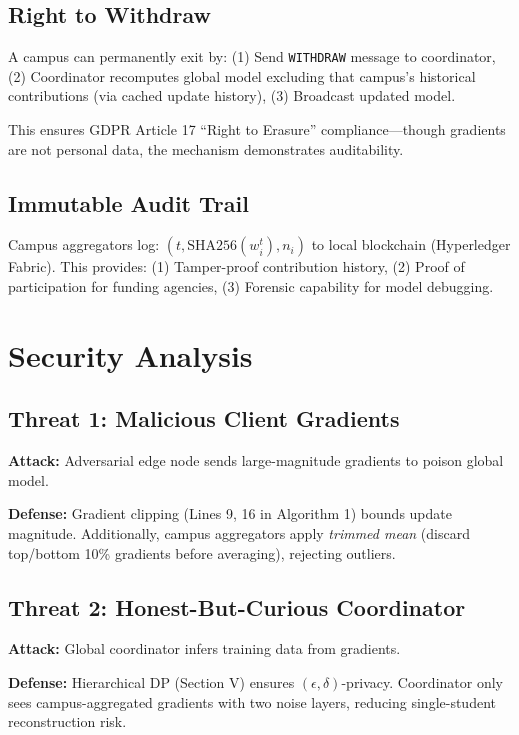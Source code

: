 \documentclass[conference]{IEEEtran}
\begin{document}
\subsection{Right to Withdraw}

A campus can permanently exit by: (1) Send \texttt{WITHDRAW} message to coordinator, (2) Coordinator recomputes global model excluding that campus's historical contributions (via cached update history), (3) Broadcast updated model.

This ensures GDPR Article 17 ``Right to Erasure'' compliance—though gradients are not personal data, the mechanism demonstrates auditability.

\subsection{Immutable Audit Trail}

Campus aggregators log: $(t, \text{SHA256}(w_i^t), n_i)$ to local blockchain (Hyperledger Fabric). This provides: (1) Tamper-proof contribution history, (2) Proof of participation for funding agencies, (3) Forensic capability for model debugging.

\section{Security Analysis}

\subsection{Threat 1: Malicious Client Gradients}

\textbf{Attack:} Adversarial edge node sends large-magnitude gradients to poison global model.

\textbf{Defense:} Gradient clipping (Lines 9, 16 in Algorithm 1) bounds update magnitude. Additionally, campus aggregators apply \textit{trimmed mean} (discard top/bottom 10\% gradients before averaging), rejecting outliers.

\subsection{Threat 2: Honest-But-Curious Coordinator}

\textbf{Attack:} Global coordinator infers training data from gradients.

\textbf{Defense:} Hierarchical DP (Section V) ensures $(\epsilon, \delta)$-privacy. Coordinator only sees campus-aggregated gradients with two noise layers, reducing single-student reconstruction risk.
\end{document}
